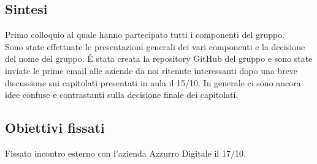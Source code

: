 \documentclass[12pt]{article}
\begin{document}
\subsection{Sintesi}
Primo colloquio al quale hanno partecipato tutti i componenti del gruppo.\\
\vspace{2mm}
Sono state effettuate le presentazioni generali dei vari componenti e la decisione del nome del gruppo. \'E stata creata la repository GitHub del gruppo e sono state inviate le prime email alle aziende da noi ritenute interessanti dopo una breve discussione sui capitolati presentati in aula il 15/10. In generale ci sono ancora idee confuse e contrastanti sulla decisione finale dei capitolati. 
\subsection{Obiettivi fissati}
Fissato incontro esterno con l'azienda Azzurro Digitale il 17/10.
\end{document}

